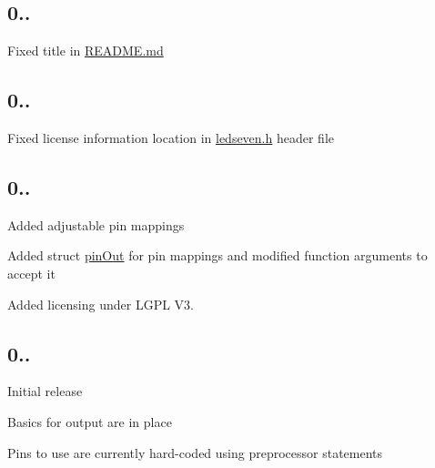 \subsection*{0..}


\begin{DoxyItemize}
\item Fixed title in \hyperlink{_r_e_a_d_m_e_8md_source}{R\+E\+A\+D\+M\+E.\+md}
\end{DoxyItemize}

\subsection*{0..}


\begin{DoxyItemize}
\item Fixed license information location in \hyperlink{ledseven_8h}{ledseven.\+h} header file
\end{DoxyItemize}

\subsection*{0..}


\begin{DoxyItemize}
\item Added adjustable pin mappings
\item Added struct {\ttfamily \hyperlink{structpin_out}{pin\+Out}} for pin mappings and modified function arguments to accept it
\item Added licensing under L\+G\+P\+L V3.
\end{DoxyItemize}

\subsection*{0..}


\begin{DoxyItemize}
\item Initial release
\item Basics for output are in place
\item Pins to use are currently hard-\/coded using preprocessor statements 
\end{DoxyItemize}